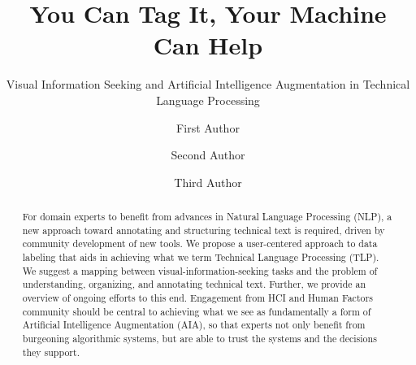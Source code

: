 \title{You Can Tag It, Your Machine Can Help}
\subtitle{Visual Information Seeking and Artificial Intelligence Augmentation in Technical Language Processing}
%
%
\author{First Author \and
Second Author \and
Third Author}
%
%
%
\maketitle              %
%
\begin{abstract}
For domain experts to benefit from advances in Natural Language Processing (NLP), a new approach toward annotating and structuring technical text is required, driven by community development of new tools.
We propose a user-centered approach to data labeling that aids in achieving what we term Technical Language Processing (TLP).
We suggest a mapping between visual-information-seeking tasks and the problem of understanding, organizing, and annotating technical text.
Further, we provide an overview of ongoing efforts to this end.
Engagement from HCI and Human Factors community should be central to achieving what we see as fundamentally a form of Artificial Intelligence Augmentation (AIA), so that experts not only benefit from burgeoning algorithmic systems, but are able to trust the systems and the decisions they support.


\end{abstract}